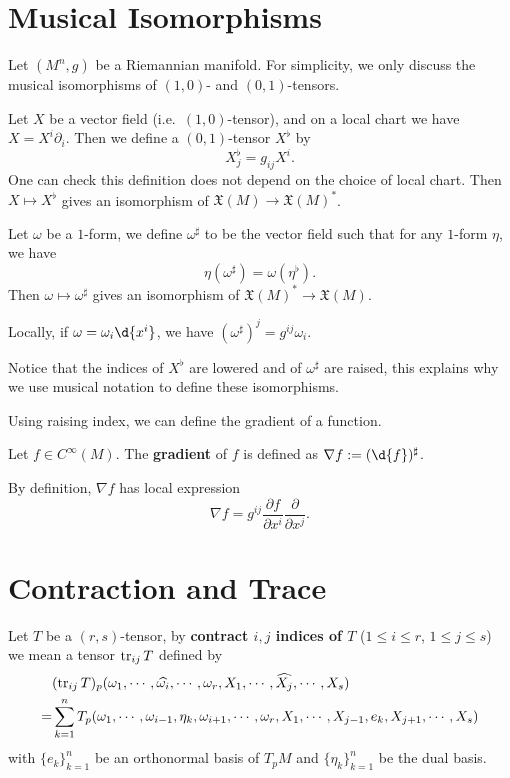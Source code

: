 \section{Musical Isomorphisms}
Let $(M^n,g)$ be a Riemannian manifold.
For simplicity, we only discuss the musical isomorphisms of $(1,0)$- and $(0,1)$-tensors.

\begin{defn}
    Let $X$ be a vector field (i.e.\ $(1,0)$-tensor), and on a local chart we have $X=X^i\partial_i$.
    Then we define a $(0,1)$-tensor $X^\flat$ by
    \[X^\flat_j=g_{ij}X^i.\]
    One can check this definition does not depend on the choice of local chart.
    Then $X\mapsto X^\flat$ gives an isomorphism of $\mathfrak{X}(M)\to\mathfrak{X}(M)^*$.
\end{defn}

\begin{defn}
    Let $\omega$ be a $1$-form, we define $\omega^\sharp$ to be the vector field such that for any $1$-form $\eta$, we have
    \[\eta(\omega^\sharp)=\omega(\eta^\flat).\]
    Then $\omega\mapsto\omega^\sharp$ gives an isomorphism of $\mathfrak{X}(M)^*\to\mathfrak{X}(M)$.
\end{defn}

Locally, if $\omega=\omega_i\d{x^i}$, we have $(\omega^\sharp)^j=g^{ij}\omega_i$.

Notice that the indices of $X^\flat$ are lowered and of $\omega^\sharp$ are raised, this explains why we use musical notation to define these isomorphisms.

Using raising index, we can define the gradient of a function.
\begin{defn}
    Let $f\in C^\infty(M)$.
    The \textbf{gradient} of $f$ is defined as $\nabla f:=(\d{f})^\sharp$.
\end{defn}

By definition, $\nabla f$ has local expression
\[\nabla f=g^{ij}\frac{\partial f}{\partial{x^i}}\frac{\partial{}}{\partial{x^j}}.\]

\section{Contraction and Trace}

\begin{defn}
    Let $T$ be a $(r,s)$-tensor, by \textbf{contract $i,j$ indices of $T$} ($1\leq i\leq r$, $1\leq j\leq s$) we mean a tensor $\operatorname{tr}_{ij}T$ defined by
    \begin{align*}
        &(\operatorname{tr}_{ij}T)_p(\omega_1,\cdots,\widehat{\omega_i},\cdots,\omega_r,X_1,\cdots,\widehat{X_j},\cdots,X_s)\\
        =&\sum_{k=1}^nT_p(\omega_1,\cdots,\omega_{i-1},\eta_k,\omega_{i+1},\cdots,\omega_r,X_1,\cdots,X_{j-1},e_k,X_{j+1},\cdots,X_s)
    \end{align*}
    with $\{e_k\}_{k=1}^n$ be an orthonormal basis of $T_pM$ and $\{\eta_k\}_{k=1}^n$ be the dual basis.
\end{defn}

